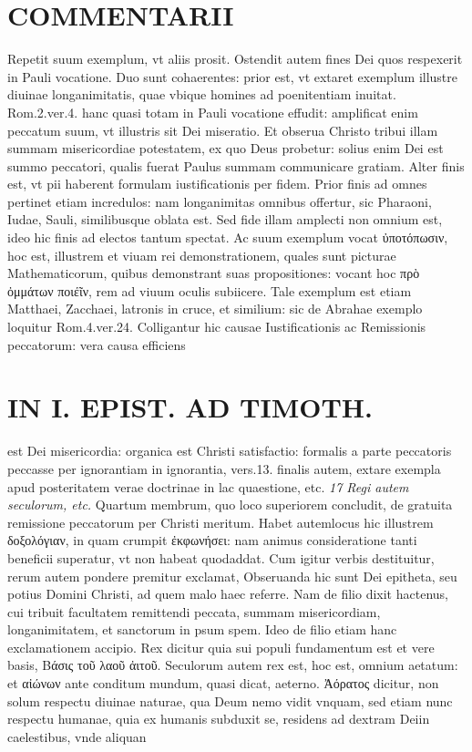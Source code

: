 \documentclass{article}
\begin{document}
\begin{pages}
\section*{COMMENTARII }
\marginpar{[ p.36 ]}\pstart Repetit suum exemplum, vt aliis prosit. Ostendit autem fines Dei quos respexerit in Pauli vocatione. Duo sunt cohaerentes: prior est, vt extaret exemplum illustre diuinae longanimitatis, quae vbique homines ad poenitentiam inuitat. Rom.2.ver.4. hanc quasi totam in Pauli vocatione effudit: amplificat enim peccatum suum, vt illustris sit Dei miseratio. Et obserua Christo tribui illam summam misericordiae potestatem, ex quo Deus probetur: solius enim Dei est summo peccatori, qualis fuerat Paulus summam communicare gratiam. Alter finis est, vt pii haberent formulam iustificationis per fidem. Prior finis ad omnes pertinet etiam incredulos: nam longanimitas omnibus offertur, sic Pharaoni, Iudae, Sauli, similibusque oblata est. Sed fide illam amplecti non omnium est, ideo hic finis ad electos tantum spectat. Ac suum exemplum vocat ὐποτόπωσιν, hoc est, illustrem et viuam rei demonstrationem, quales sunt picturae Mathematicorum, quibus demonstrant suas propositiones: vocant hoc πρὸ ὀμμάτων ποιέῖν, rem ad viuum oculis subiicere. Tale exemplum est etiam Matthaei, Zacchaei, latronis in cruce, et similium: sic de Abrahae exemplo loquitur Rom.4.ver.24. Colligantur hic causae Iustificationis ac Re\pend\pstart missionis peccatorum: vera causa efficiens  \pend
\section*{IN I. EPIST. AD TIMOTH. }
\marginpar{[ p.37 ]}\pstart est Dei misericordia: organica est Christi satisfactio: formalis a parte peccatoris peccasse per ignorantiam in ignorantia, vers.13. finalis autem, extare exempla apud posteritatem verae doctrinae in lac quaestione, etc.  \pend
\textit{17 Regi autem seculorum, etc. }\pstart Quartum membrum, quo loco superiorem concludit, de gratuita remissione peccatorum per Christi meritum. Habet autemlocus hic illustrem δοξολόγιαν, in quam crumpit ἐκφωνήσει: nam animus consideratione tanti beneficii superatur, vt non habeat quodaddat. Cum igitur verbis destituitur, rerum autem pondere premitur exclamat, Obseruanda hic sunt Dei epitheta, seu potius Domini Christi, ad quem malo haec referre. Nam de filio dixit hactenus, cui tribuit facultatem remittendi peccata, summam misericordiam, longanimitatem, et sanctorum in psum spem. Ideo de filio etiam hanc exclamationem accipio. Rex dicitur quia sui populi fundamentum est et vere basis, Βάσις τοῦ λαοῦ ἀιτοῦ. Seculorum autem rex est, hoc est, omnium aetatum: et αἰώνων ante conditum mundum, quasi dicat, aeterno. Ἀόρατος dicitur, non solum respectu diuinae naturae, qua Deum nemo vidit vnquam, sed etiam nunc respectu humanae, quia ex humanis subduxit se, residens ad dextram Deiin caelestibus, vnde aliquan\pend

\end{pages}
\end{document}
